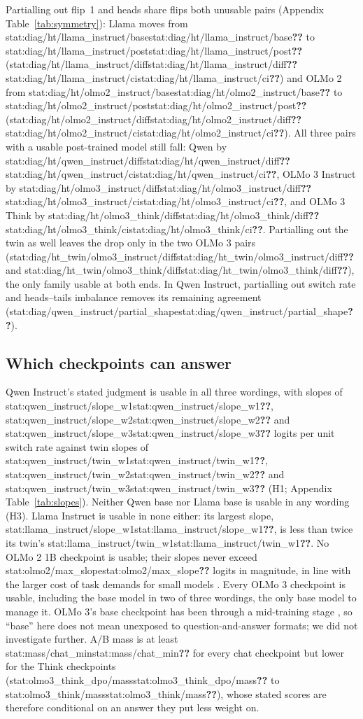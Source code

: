 \documentclass[11pt]{article}
\newcommand{\stat}[1]{\ifcsname stat:#1\endcsname\csname stat:#1\endcsname\else\textbf{??}\fi}
\begin{document}
Partialling out flip~1 and heads share flips both unusable pairs (Appendix Table~\ref{tab:symmetry}): Llama moves from \stat{diag/ht/llama_instruct/base} to \stat{diag/ht/llama_instruct/post} (\stat{diag/ht/llama_instruct/diff} \stat{diag/ht/llama_instruct/ci}) and OLMo 2 from \stat{diag/ht/olmo2_instruct/base} to \stat{diag/ht/olmo2_instruct/post} (\stat{diag/ht/olmo2_instruct/diff} \stat{diag/ht/olmo2_instruct/ci}). All three pairs with a usable post-trained model still fall: Qwen by \stat{diag/ht/qwen_instruct/diff} \stat{diag/ht/qwen_instruct/ci}, OLMo 3 Instruct by \stat{diag/ht/olmo3_instruct/diff} \stat{diag/ht/olmo3_instruct/ci}, and OLMo 3 Think by \stat{diag/ht/olmo3_think/diff} \stat{diag/ht/olmo3_think/ci}. Partialling out the twin as well leaves the drop only in the two OLMo 3 pairs (\stat{diag/ht_twin/olmo3_instruct/diff} and \stat{diag/ht_twin/olmo3_think/diff}), the only family usable at both ends. In Qwen Instruct, partialling out switch rate and heads--tails imbalance removes its remaining agreement (\stat{diag/qwen_instruct/partial_shape}).

\subsection{Which checkpoints can answer}
\label{sec:usable}
Qwen Instruct's stated judgment is usable in all three wordings, with slopes of \stat{qwen_instruct/slope_w1}, \stat{qwen_instruct/slope_w2} and \stat{qwen_instruct/slope_w3} logits per unit switch rate against twin slopes of \stat{qwen_instruct/twin_w1}, \stat{qwen_instruct/twin_w2} and \stat{qwen_instruct/twin_w3} (H1; Appendix Table~\ref{tab:slopes}). Neither Qwen base nor Llama base is usable in any wording (H3). Llama Instruct is usable in none either: its largest slope, \stat{llama_instruct/slope_w1}, is less than twice its twin's \stat{llama_instruct/twin_w1}. No OLMo 2 1B checkpoint is usable; their slopes never exceed \stat{olmo2/max_slope} logits in magnitude, in line with the larger cost of task demands for small models \citep{hu2024auxiliary}. Every OLMo 3 checkpoint is usable, including the base model in two of three wordings, the only base model to manage it. OLMo 3's base checkpoint has been through a mid-training stage \citep{olmo2025olmo3}, so ``base'' here does not mean unexposed to question-and-answer formats; we did not investigate further. A/B mass is at least \stat{mass/chat_min} for every chat checkpoint but lower for the Think checkpoints (\stat{olmo3_think_dpo/mass} to \stat{olmo3_think/mass}), whose stated scores are therefore conditional on an answer they put less weight on.
\end{document}
